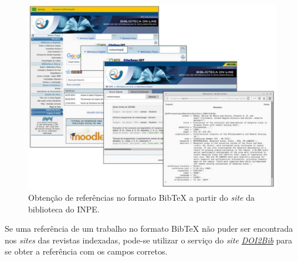 \begin{figure}[H]
\caption{Obtenção de referências no formato Bib\TeX{} a partir do \textit{site} da biblioteca do INPE.}
\vspace{6mm}
    \begin{center}
        \includegraphics[scale=0.45]{./docs/figs/bibliotex.pdf}
    \end{center}
\vspace{4mm}
\label{fig:bibliotex}
\end{figure}


\begin{marker}
Se uma referência de um trabalho no formato Bib\TeX{} não puder ser encontrada nos \textit{sites} das revistas indexadas, pode-se utilizar o serviço do \textit{site} \href{https://doi2bib.org}{\textit{DOI2Bib}} para se obter a referência com os campos corretos.
\end{marker}


